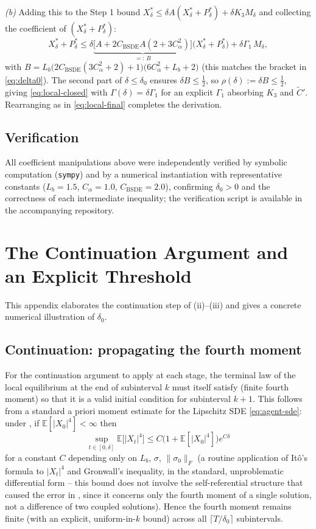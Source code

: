 \documentclass[11pt]{article}
\theoremstyle{remark}
\begin{document}
\emph{(b)} Adding this to the Step 1 bound $X^*_\delta \le \delta
A(X^*_\delta+P^*_\delta) + \delta K_3 M_\delta$ and collecting the coefficient of
$(X^*_\delta+P^*_\delta)$:
\[
    X^*_\delta+P^*_\delta \le \delta\underbrace{\Big[A + 2C_{\mathrm{BSDE}}
    A(2+3C_\alpha^2)\Big]}_{=:\, B}\big(X^*_\delta+P^*_\delta\big) + \delta
    \Gamma_1\, M_\delta,
\]
with $B = L_b\big(2C_{\mathrm{BSDE}}(3C_\alpha^2+2)+1\big)\big(6C_\alpha^2+L_b+2\big)$
(this matches the bracket in \eqref{eq:delta0}). The second part of
$\delta \le \delta_0$ ensures $\delta B \le \tfrac12$, so $\rho(\delta) := \delta B
\le \tfrac12$, giving \eqref{eq:local-closed} with $\Gamma(\delta) = \delta\Gamma_1$
for an explicit $\Gamma_1$ absorbing $K_3$ and $\widetilde{C}'$. Rearranging as in
\eqref{eq:local-final} completes the derivation.

\subsection{Verification}

All coefficient manipulations above were independently verified by symbolic
computation (\texttt{sympy}) and by a numerical instantiation with representative
constants ($L_b=1.5$, $C_\alpha=1.0$, $C_{\mathrm{BSDE}}=2.0$), confirming
$\delta_0 > 0$ and the correctness of each intermediate inequality; the
verification script is available in the accompanying repository.

\section{The Continuation Argument and an Explicit Threshold}
\label{app:contraction-proof}

This appendix elaborates the continuation step of (ii)--(iii)
and gives a concrete numerical illustration of $\delta_0$.

\subsection{Continuation: propagating the fourth moment}

For the continuation argument to apply at each stage, the terminal law of the local
equilibrium at the end of subinterval $k$ must itself satisfy 
(finite fourth moment) so that it is a valid initial condition for subinterval
$k+1$. This follows from a standard a priori moment estimate for the Lipschitz SDE
\eqref{eq:agent-sde}: under , if
$\mathbb{E}[|X_0|^4] < \infty$ then
\[
    \sup_{t\in[0,\delta]} \mathbb{E}\big[|X_t|^4\big] \le
    C\big(1+\mathbb{E}[|X_0|^4]\big)e^{C\delta}
\]
for a constant $C$ depending only on $L_b$, $\sigma$, $\|\sigma_0\|_F$ (a routine
application of It\^o's formula to $|X_t|^4$ and Gronwall's inequality, in the
standard, unproblematic differential form -- this bound does not involve the
self-referential structure that caused the error in , since it
concerns only the fourth moment of a single solution, not a difference of two
coupled solutions). Hence the fourth moment remains finite (with an explicit,
uniform-in-$k$ bound) across all $\lceil T/\delta_0 \rceil$ subintervals.
\end{document}
